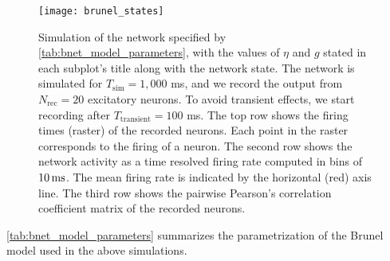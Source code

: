 \begin{figure}[H]
    \centering
    \texttt{[image: brunel\_states]}
    \caption{Simulation of the network specified by \autoref{tab:bnet_model_parameters}, with the values of $\eta$ and $g$ stated in each subplot's title along with the network state. The network is simulated for $T_\mathrm{sim} = 1,000$ ms, and we record the output from $N_\mathrm{rec} = 20$ excitatory neurons. To avoid transient effects, we start recording after $T_\mathrm{transient} = 100$ ms. The top row shows the firing times (raster) of the recorded neurons. Each point in the raster corresponds to the firing of a neuron. The second row shows the network activity as a time resolved firing rate computed in bins of $10 \,\mathrm{ms}$. The mean firing rate is indicated by the horizontal (red) axis line. The third row shows the pairwise Pearson's correlation coefficient matrix of the recorded neurons.
    }
    \label{fig:brunel_states}
\end{figure}


\autoref{tab:bnet_model_parameters} summarizes the parametrization of the Brunel model used in the above simulations.

